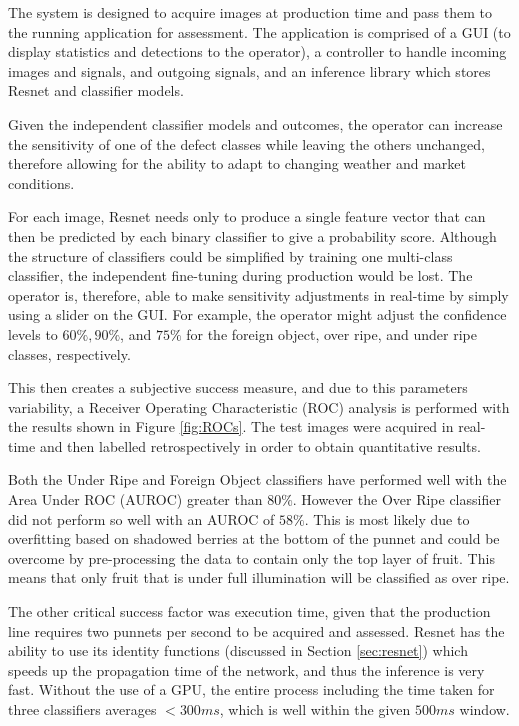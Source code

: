 \documentclass[conference]{IEEEtran}
\begin{document}
The system is designed to acquire images at production time and pass them to the running application for assessment. The application is comprised of a GUI (to display statistics and detections to the operator), a controller to handle incoming images and signals, and outgoing signals, and an inference library which stores Resnet and classifier models.  


Given the independent classifier models and outcomes, the operator can increase the sensitivity of one of the defect classes while leaving the others unchanged, therefore allowing for the ability to adapt to changing weather and market conditions. 


For each image, Resnet needs only to produce a single feature vector that can then be predicted by each binary classifier to give a probability score. Although the structure of classifiers could be simplified by training one multi-class classifier, the independent fine-tuning during production would be lost. The operator is, therefore, able to make sensitivity adjustments in real-time by simply using a slider on the GUI. For example, the operator might adjust the confidence levels to $60\%, 90\%$, and $75\%$ for the foreign object, over ripe, and under ripe classes, respectively.

This then creates a subjective success measure, and due to this parameters variability, a Receiver Operating Characteristic (ROC) analysis  is performed with the results shown in Figure \ref{fig:ROCs}. The test images were acquired in real-time and then labelled retrospectively in order to obtain quantitative results.  

Both the Under Ripe and Foreign Object classifiers have performed well with the  Area Under ROC (AUROC) greater than $80\%$. However the Over Ripe classifier did not perform so well with an AUROC of $58\%$. This is most likely due to overfitting based on shadowed berries at the bottom of the punnet and could be overcome by pre-processing the data to contain only the top layer of fruit. This means that only fruit that is under full illumination will be classified as over ripe.

The other critical success factor was execution time, given that the production line requires two punnets per second to be acquired and assessed. Resnet has the ability to use its identity functions (discussed in Section \ref{sec:resnet}) which speeds up the propagation time of the network, and thus the inference is very fast. Without the use of a GPU, the entire process including the time taken for three classifiers averages $<300ms$, which is well within the given $500ms$ window.   
\end{document}
